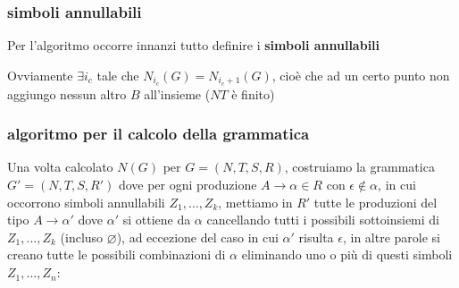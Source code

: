 \subsubsection{simboli annullabili}
Per l'algoritmo occorre innanzi tutto definire i \textbf{simboli annullabili}

Ovviamente $\exists i_c$ tale che $N_{i_c}(G)=N_{i_c+1}(G)$, cioè che ad un certo punto non aggiungo nessun altro $B$ all'insieme ($NT$ è finito)

\subsubsection{algoritmo per il calcolo della grammatica}


Una volta calcolato \( N(G) \) per \( G = (N, T, S, R) \), costruiamo la grammatica \( G' = (N, T, S, R') \) dove per ogni produzione \( A \rightarrow \alpha \in R \) con \( \epsilon \not\in \alpha \), in cui occorrono simboli annullabili \( Z_1, \ldots, Z_k \), mettiamo in \( R' \) tutte le produzioni del tipo \( A \rightarrow \alpha' \) dove \( \alpha' \) si ottiene da \( \alpha \) cancellando tutti i possibili sottoinsiemi di \( Z_1, \ldots, Z_k \) (incluso \( \varnothing \)), ad eccezione del caso in cui \( \alpha' \) risulta \( \epsilon \), in altre parole si creano tutte le possibili combinazioni di $\alpha$ eliminando uno o più di questi simboli $Z_1,\dots,Z_n$:

